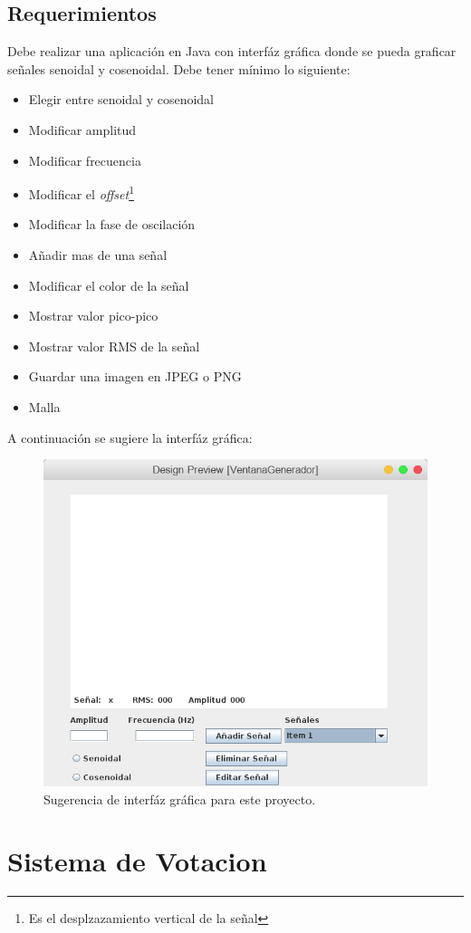 \documentclass[11pt]{article}
\begin{document}
\subsection{Requerimientos}
Debe realizar una aplicación en Java con interfáz gráfica donde se pueda graficar señales senoidal y cosenoidal. Debe tener mínimo lo siguiente:

\begin{itemize}
\item Elegir entre senoidal y cosenoidal
\item Modificar amplitud
\item Modificar frecuencia
\item Modificar el \emph{offset}\footnote{Es el desplzazamiento vertical de la señal}
\item Modificar la fase de oscilación
\item Añadir mas de una señal
\item Modificar el color de la señal
\item Mostrar valor pico-pico
\item Mostrar valor RMS de la señal
\item Guardar una imagen en JPEG o PNG
\item Malla
\end{itemize}

A continuación se sugiere la interfáz gráfica:


\begin{figure}
\centering
\includegraphics[scale=0.5]{pics/pic3.png}
\caption{Sugerencia de interfáz gráfica para este proyecto.}
\end{figure}




\newpage


\section{Sistema de Votacion}



\end{document}
